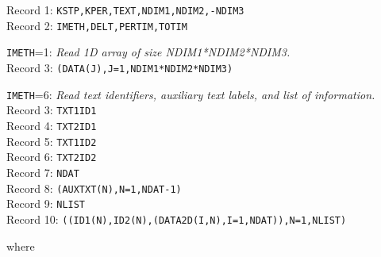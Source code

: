 \vspace{5mm}
\noindent Record 1: \texttt{KSTP,KPER,TEXT,NDIM1,NDIM2,-NDIM3} \\
\noindent Record 2: \texttt{IMETH,DELT,PERTIM,TOTIM} \\

\begin{description}
\item \texttt{IMETH}=1: \textit{Read 1D array of size NDIM1*NDIM2*NDIM3.}\\
Record 3: \texttt{(DATA(J),J=1,NDIM1*NDIM2*NDIM3)}

\item \texttt{IMETH}=6: \textit{Read text identifiers, auxiliary text labels, and list of information.}\\
Record 3: \texttt{TXT1ID1}\\
Record 4: \texttt{TXT2ID1}\\
Record 5: \texttt{TXT1ID2}\\
Record 6: \texttt{TXT2ID2}\\
Record 7: \texttt{NDAT}\\
Record 8: \texttt{(AUXTXT(N),N=1,NDAT-1)}\\
Record 9: \texttt{NLIST}\\
Record 10: \texttt{((ID1(N),ID2(N),(DATA2D(I,N),I=1,NDAT)),N=1,NLIST)}\\
\end{description}

\noindent where

